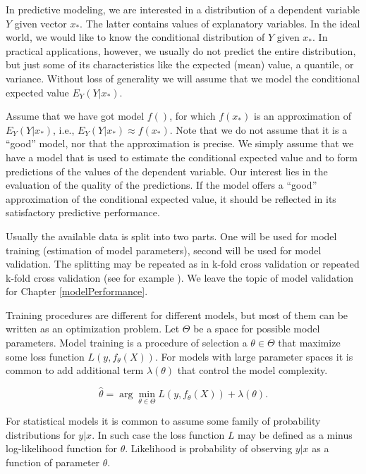 \documentclass[12pt,]{krantz}
\begin{document}
In predictive modeling, we are interested in a distribution of a dependent variable \(Y\) given vector \(x_*\). The latter contains values of explanatory variables. In the ideal world, we would like to know the conditional distribution of \(Y\) given \(x_*\). In practical applications, however, we usually do not predict the entire distribution, but just some of its characteristics like the expected (mean) value, a quantile, or variance. Without loss of generality we will assume that we model the conditional expected value \(E_Y(Y | x_*)\).

Assume that we have got model \(f()\), for which \(f(x_*)\) is an approximation of \(E_Y(Y | x_*)\), i.e., \(E_Y(Y | x_*) \approx f(x_*)\). Note that we do not assume that it is a ``good'' model, nor that the approximation is precise. We simply assume that we have a model that is used to estimate the conditional expected value and to form predictions of the values of the dependent variable. Our interest lies in the evaluation of the quality of the predictions. If the model offers a ``good'' approximation of the conditional expected value, it should be reflected in its satisfactory predictive performance.

Usually the available data is split into two parts. One will be used for model training (estimation of model parameters), second will be used for model validation. The splitting may be repeated as in k-fold cross validation or repeated k-fold cross validation (see for example \citep{AppliedPredictiveModeling2013}). We leave the topic of model validation for Chapter \ref{modelPerformance}.

Training procedures are different for different models, but most of them can be written as an optimization problem. Let \(\Theta\) be a space for possible model parameters. Model training is a procedure of selection a \(\theta \in \Theta\) that maximize some loss function \(L(y, f_\theta(X))\). For models with large parameter spaces it is common to add additional term \(\lambda(\theta)\) that control the model complexity.

\begin{equation}
\hat\theta = \arg \min_{\theta \in \Theta}  L (y, f_\theta(X)) + \lambda(\theta). 
\label{eq:modelTrainingEq1}
\end{equation}

For statistical models it is common to assume some family of probability distributions for \(y|x\). In such case the loss function \(L\) may be defined as a minus log-likelihood function for \(\theta\). Likelihood is probability of observing \(y|x\) as a function of parameter \(\theta\).
\end{document}
